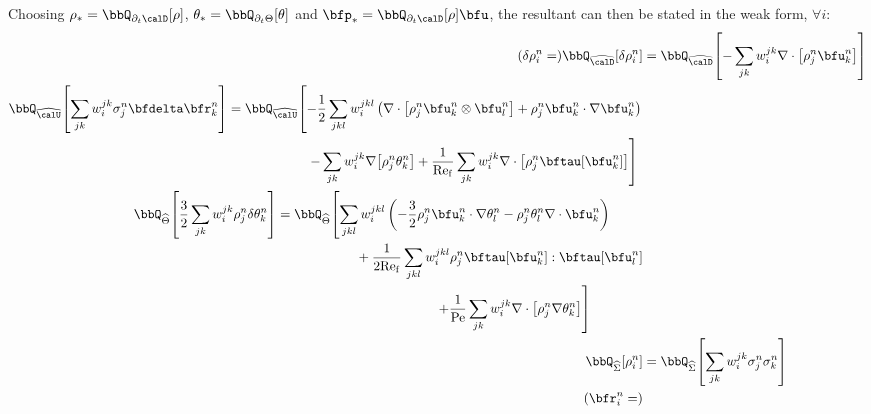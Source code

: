 \begin{example}
        Choosing $\rho_{*} = \bbQ_{\partial_{t}\calD}[\rho]$, $\theta_{*} = \bbQ_{\partial_{t}\Theta}[\theta]$ and $\bfp_{*} = \bbQ_{\partial_{t}\calD}[\rho]\bfu$, the resultant can then be stated in the weak form, $\forall i$:
        \begin{align}
                (\delta\rho_{i}^{n}
                =)
                \bbQ_{\widehat{\calD}}\!\left[\delta\rho_{i}^{n}\right]
                &=
                \bbQ_{\widehat{\calD}}\!\left[- \sum_{jk}w_{i}^{jk}\nabla\cdot\left[\rho_{j}^{n}\bfu_{k}^{n}\right]\right]  \\
            \begin{split}
                \bbQ_{\widehat{\calU}}\!\left[\sum_{jk}w_{i}^{jk}\sigma_{j}^{n}\bfdelta\bfr_{k}^{n}\right]
                &=
                \bbQ_{\widehat{\calU}}\!\left[- \frac{1}{2}\sum_{jkl}w_{i}^{jkl}\left(\nabla\cdot\left[\rho_{j}^{n}\bfu_{k}^{n}\otimes\bfu_{l}^{n}\right] + \rho_{j}^{n}\bfu_{k}^{n}\cdot\nabla\bfu_{k}^{n}\right)\right.  \\
                &\qquad\qquad\qquad\left.- \sum_{jk}w_{i}^{jk}\nabla\!\left[\rho_{j}^{n}\theta_{k}^{n}\right]
                + \frac{1}{\rmRef}\sum_{jk}w_{i}^{jk}\nabla\cdot\left[\rho_{j}^{n}\bftau\!\left[\bfu_{k}^{n}\right]\right]\right]
            \end{split}  \\
            \begin{split}
                \bbQ_{\widehat{\Theta}}\!\left[\frac{3}{2}\sum_{jk}w_{i}^{jk}\rho_{j}^{n}\delta\theta_{k}^{n}\right]
                &=
                \bbQ_{\widehat{\Theta}}\!\left[\sum_{jkl}w_{i}^{jkl}\left(- \frac{3}{2}\rho_{j}^{n}\bfu_{k}^{n}\cdot\nabla\theta_{l}^{n}
                - \rho_{j}^{n}\theta_{l}^{n}\nabla\cdot\bfu_{k}^{n}\right)\right.  \\
                &\qquad\qquad\qquad+ \frac{1}{2\rmRef}\sum_{jkl}w_{i}^{jkl}\rho_{j}^{n}\bftau\!\left[\bfu_{k}^{n}\right]:\bftau\!\left[\bfu_{l}^{n}\right]  \\
                &\qquad\qquad\qquad\qquad\qquad\qquad\left.+ \frac{1}{\rmPe}\sum_{jk}w_{i}^{jk}\nabla\cdot\left[\rho_{j}^{n}\nabla\theta_{k}^{n}\right]\right]
            \end{split}  \\
                \bbQ_{\widehat{\Sigma}}[\rho_{i}^{n}]
                &=
                \bbQ_{\widehat{\Sigma}}\!\left[\sum_{jk}w_{i}^{jk}\sigma_{j}^{n}\sigma_{k}^{n}\right]  \\
                \left(\bfr_{i}^{n}
                =\right)

\end{align}
\end{example}
